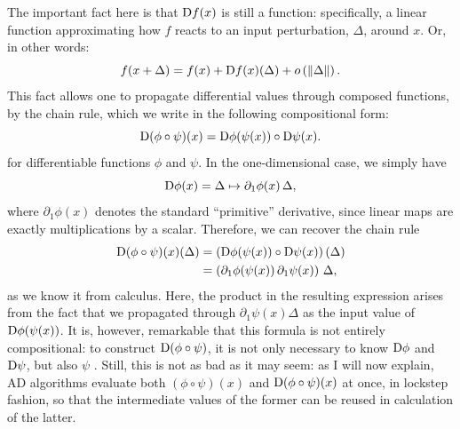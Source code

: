 The important fact here is that \(\mathop{}\!\mathrm{D} f(x)\) is still a function: specifically, a linear function
approximating how \(f\) reacts to an input perturbation, \(\Delta\), around \(x\).  Or, in other
words:
\begin{equation}
  f(x + \Delta) = f(x) + \mathop{}\!\mathrm{D} f(x)(\Delta) + o\left(\left\lVert\Delta\right\rVert\right).
\end{equation}
This fact allows one to propagate differential values through composed functions, by the chain rule,
which we write in the following compositional form:
\begin{equation}
  \mathop{}\!\mathrm{D}(\phi \circ \psi)(x) = \mathop{}\!\mathrm{D}\phi(\psi(x)) \circ \mathop{}\!\mathrm{D}\psi(x).
\end{equation}
for differentiable functions \(\phi\) and \(\psi\).  In the one-dimensional case, we simply have
\begin{equation}
  \mathop{}\!\mathrm{D} \phi(x) = \Delta \mapsto \partial_1 \phi(x) \, \Delta,
\end{equation}
where \(\partial_1 \phi(x)\) denotes the standard \enquote{primitive} derivative, since linear maps
are exactly multiplications by a scalar.  Therefore, we can recover the chain rule
\begin{equation}
  \begin{aligned}
    \mathop{}\!\mathrm{D}(\phi \circ \psi)(x)(\Delta) &=
    \left( \mathop{}\!\mathrm{D}\phi(\psi(x)) \circ \mathop{}\!\mathrm{D}\psi(x) \right)(\Delta) \\
    &= \left( \partial_1\phi(\psi(x)) \, \partial_1 \psi(x) \right) \, \Delta,
  \end{aligned}
\end{equation}
as we know it from calculus.  Here, the product in the resulting expression arises from the fact
that we propagated through \(\partial_1 \psi(x) \Delta\) as the input value of
\(\mathop{}\!\mathrm{D}\phi(\psi(x))\).  It is, however, remarkable that this formula is not entirely compositional:
to construct \(\mathop{}\!\mathrm{D}(\phi \circ \psi)\), it is not only necessary to know \(\mathop{}\!\mathrm{D}\phi\) and
\(\mathop{}\!\mathrm{D}\psi\), but also \(\psi\) \parencite{elliott2018simple}.  Still, this is not as bad as it may
seem: as I will now explain, AD algorithms evaluate both \((\phi \circ \psi)(x)\) and
\(\mathop{}\!\mathrm{D}(\phi \circ \psi)(x)\) at once, in lockstep fashion, so that the intermediate values of the
former can be reused in calculation of the latter.

